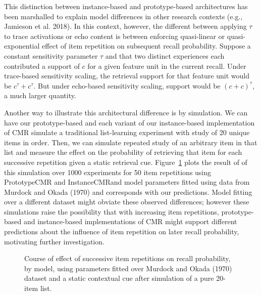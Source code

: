 \documentclass[
  letterpaper,
  DIV=11]{article}
\begin{document}
This distinction between instance-based and prototype-based
architectures has been marshalled to explain model differences in other
research contexts (e.g., Jamieson et al. 2018). In this context,
however, the different between applying \(\tau\) to trace activations or
echo content is between enforcing quasi-linear or quasi-exponential
effect of item repetition on subsequent recall probability. Suppose a
constant sensitivity parameter \(\tau\) and that two distinct
experiences each contributed a support of \(c\) for a given feature unit
in the current recall. Under trace-based sensitivity scaling, the
retrieval support for that feature unit would be
\(c^{\tau} + c^{\tau}\). But under echo-based sensitivity scaling,
support would be \({(c + c)}^{\tau}\), a much larger quantity.

Another way to illustrate this architectural difference is by
simulation. We can have our prototype-based and each variant of our
instance-based implementation of CMR simulate a traditional
list-learning experiment with study of 20 unique items in order. Then,
we can simulate repeated study of an arbitrary item in that list and
measure the effect on the probability of retrieving that item for each
successive repetition given a static retrieval cue.
Figure~\ref{fig-repeffect} plots the result of of this simulation over
1000 experiments for 50 item repetitions using PrototypeCMR and
InstanceCMRand model parameters fitted using data from Murdock and Okada
(1970) and corresponds with our predictions. Model fitting over a
different dataset might obviate these observed differences; however
these simulations raise the possibility that with increasing item
repetitions, prototype-based and instance-based implementations of CMR
might support different predictions about the influence of item
repetition on later recall probability, motivating further
investigation.

\begin{figure}

%

\caption{\label{fig-repeffect}Course of effect of successive item
repetitions on recall probability, by model, using parameters fitted
over Murdock and Okada (1970) dataset and a static contextual cue after
simulation of a pure 20-item list.}

\end{figure}
\end{document}
